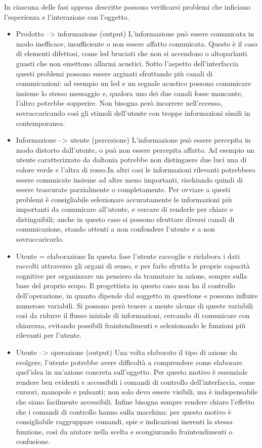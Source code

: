 \documentclass[11pt,a4paper]{article}
\begin{document}
In ciascuna delle fasi appena descritte possono verificarsi problemi che inficiano l’esperienza e l’interazione con l’oggetto.
\begin{itemize}
	\item Prodotto --> informazione (output)
		\tab L'informazione può essere comunicata in modo inefficace, insufficiente o non essere affatto comunicata. Questo è il caso di elementi difettosi, come led bruciati che non si accendono o altoparlanti guasti che non emettono allarmi acustici. Sotto l’aspetto dell’interfaccia questi problemi possono essere arginati sfruttando più canali di comunicazioni: ad esempio un led e un segnale acustico possono comunicare insieme lo stesso messaggio e, qualora uno dei due canali fosse mancante, l’altro potrebbe sopperire. Non bisogna però incorrere nell’eccesso, sovraccaricando così gli stimoli dell’utente con troppe informazioni simili in contemporanea.
	\item Informazione --> utente (percezione)
		\tab L’informazione può essere percepita in modo distorto dall’utente, o può non essere percepita affatto. Ad esempio un utente caratterizzato da daltonia potrebbe non distinguere due luci una di colore verde e l’altra di rosso.In altri casi le informazioni rilevanti potrebbero essere comunicate insieme ad altre meno importanti, rischiando quindi di essere trascurate parzialmente o completamente.
Per ovviare a questi problemi è consigliabile selezionare accuratamente le informazioni più importanti da comunicare all’utente, e cercare di renderle per chiare e distinguibili; anche in questo caso si possono sfruttare diversi canali di comunicazione, stando attenti a non confondere l’utente e a non sovraccaricarlo.
	\item Utente = elaborazione
		\tab In questa fase l’utente raccoglie e rielabora i dati raccolti attraverso gli organi di senso, e per farlo sfrutta le proprie capacità cognitive per organizzare un pensiero da tramutare in azione, sempre sulla base del proprio scopo. Il progettista in questo caso non ha il controllo dell’operazione, in quanto dipende dal soggetto in questione e possono influire numerose variabili. Si possono però tenere a mente alcune di queste variabili così da ridurre il flusso iniziale di informazioni, cercando di comunicare con chiarezza, evitando possibili fraintendimenti e selezionando le funzioni più rilevanti per l’utente.
	\item Utente --> operazione (output)
		\tab Una volta elaborato il tipo di azione da svolgere, l’utente potrebbe avere difficoltà a comprendere come elaborare quel’idea in un’azione concreta sull’oggetto. Per questo motivo è essenziale rendere ben evidenti e accessibili i comandi di controllo dell’interfaccia, come cursori, manopole e pulsanti; non solo devo essere visibili, ma è indispensabile che siano facilmente accessibili. Infine bisogna sempre rendere chiaro l’effetto che i comandi di controllo hanno sulla macchina: per questo motivo è consigliabile raggruppare comandi, spie e indicazioni inerenti la stessa funzione, così da aiutare nella scelta e scongiurando fraintendimenti o confusione.

\end{itemize}
\end{document}

